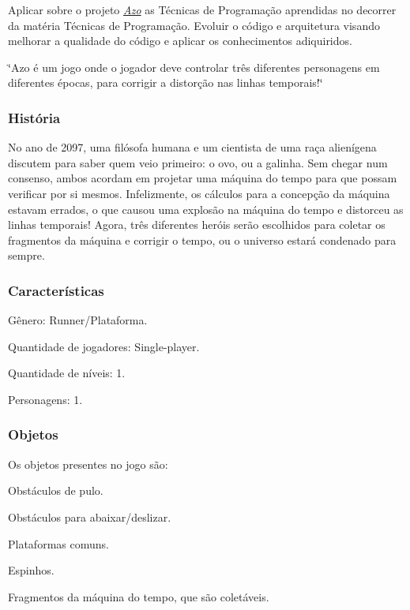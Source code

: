 Aplicar sobre o projeto {\itshape \hyperlink{namespace_azo}{Azo}} as Técnicas de Programação aprendidas no decorrer da matéria Técnicas de Programação. Evoluir o código e arquitetura visando melhorar a qualidade do código e aplicar os conhecimentos adiquiridos.

\char`\"{}\+Azo é um jogo onde o jogador deve controlar três diferentes personagens em diferentes épocas, para corrigir a distorção nas linhas temporais!\char`\"{}

\subsubsection*{História}

No ano de 2097, uma filósofa humana e um cientista de uma raça alienígena discutem para saber quem veio primeiro\+: o ovo, ou a galinha. Sem chegar num consenso, ambos acordam em projetar uma máquina do tempo para que possam verificar por si mesmos. Infelizmente, os cálculos para a concepção da máquina estavam errados, o que causou uma explosão na máquina do tempo e distorceu as linhas temporais! Agora, três diferentes heróis serão escolhidos para coletar os fragmentos da máquina e corrigir o tempo, ou o universo estará condenado para sempre.

\subsubsection*{Características}


\begin{DoxyItemize}
\item Gênero\+: Runner/\+Plataforma.
\item Quantidade de jogadores\+: Single-\/player.
\item Quantidade de níveis\+: 1.
\item Personagens\+: 1.
\end{DoxyItemize}

\subsubsection*{Objetos}

Os objetos presentes no jogo são\+:
\begin{DoxyItemize}
\item Obstáculos de pulo.
\item Obstáculos para abaixar/deslizar.
\item Plataformas comuns.
\item Espinhos.
\item Fragmentos da máquina do tempo, que são coletáveis.
\end{DoxyItemize}

